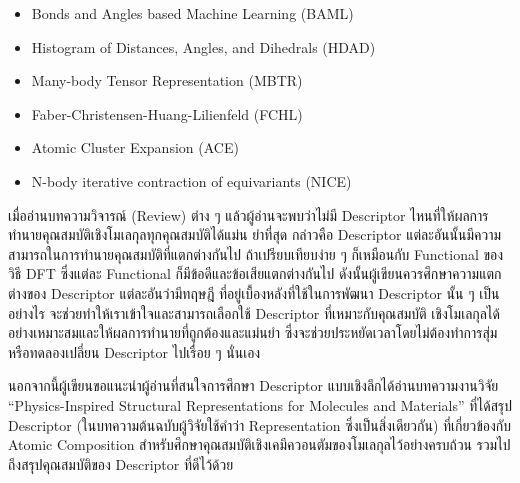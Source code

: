 \begin{itemize}[topsep=0pt]
    \item Bonds and Angles based Machine Learning (BAML)\autocite{huang2016}

    \item Histogram of Distances, Angles, and Dihedrals (HDAD)\autocite{faber2017}

    \item Many-body Tensor Representation (MBTR)\autocite{huo2022,langer2022}

    \item Faber-Christensen-Huang-Lilienfeld (FCHL)\autocite{faber2018}

    \item Atomic Cluster Expansion (ACE)\autocite{drautz2019,kovacs2021}

    \item N-body iterative contraction of equivariants (NICE)\autocite{nigam2020}
\end{itemize}

เมื่ออ่านบทความวิจารณ์ (Review) ต่าง ๆ แล้วผู้อ่านจะพบว่าไม่มี Descriptor ไหนที่ให้ผลการทำนายคุณสมบัติเชิงโมเลกุลทุกคุณสมบัติได้แม่น%
ยำที่สุด กล่าวคือ Descriptor แต่ละอันนั้นมีความสามารถในการทำนายคุณสมบัติที่แตกต่างกันไป ถ้าเปรียบเทียบง่าย ๆ ก็เหมือนกับ Functional
ของวิธี DFT ซึ่งแต่ละ Functional ก็มีข้อดีและข้อเสียแตกต่างกันไป ดังนั้นผู้เขียนควรศึกษาความแตกต่างของ Descriptor แต่ละอันว่ามีทฤษฎี%
ที่อยู่เบื้องหลังที่ใช้ในการพัฒนา Descriptor นั้น ๆ เป็นอย่างไร จะช่วยทำให้เราเข้าใจและสามารถเลือกใช้ Descriptor ที่เหมาะกับคุณสมบัติ%
เชิงโมเลกุลได้อย่างเหมาะสมและให้ผลการทำนายที่ถูกต้องและแม่นยำ ซึ่งจะช่วยประหยัดเวลาโดยไม่ต้องทำการสุ่มหรือทดลองเปลี่ยน Descriptor
ไปเรื่อย ๆ นั่นเอง

นอกจากนี้ผู้เขียนขอแนะนำผู้อ่านที่สนใจการศึกษา Descriptor แบบเชิงลึกได้อ่านบทความงานวิจัย \enquote{Physics-Inspired Structural
    Representations for Molecules and Materials}\autocite{musil2021} ที่ได้สรุป Descriptor (ในบทความต้นฉบับผู้วิจัยใช้คำว่า
Representation ซึ่งเป็นสิ่งเดียวกัน) ที่เกี่ยวข้องกับ Atomic Composition สำหรับศึกษาคุณสมบัติเชิงเคมีควอนตัมของโมเลกุลไว้อย่างครบถ้วน
รวมไปถึงสรุปคุณสมบัติของ Descriptor ที่ดีไว้ด้วย
